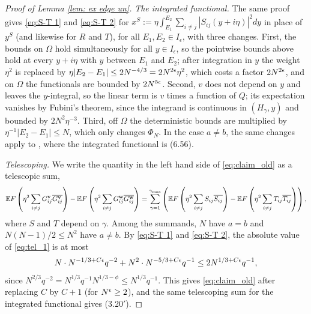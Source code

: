 \begin{proof}[Proof of Lemma \ref{lem: ex edge un}]
\textit{The integrated functional.} The same proof gives \eqref{eq:S-T 1} and \eqref{eq:S-T 2} for $x^S:=\eta\int_{E_1}^{E_2}\sum_{i\ne j}|S_{ij}(y+i\eta)|^2dy$ in place of $y^S$ (and likewise for $R$ and $T$), for all $E_1,E_2\in I_\epsilon$, with three changes. First, the bounds on $\Omega$ hold simultaneously for all $y\in I_\epsilon$, so the pointwise bounds above hold at every $y+i\eta$ with $y$ between $E_1$ and $E_2$; after integration in $y$ the weight $\eta^2$ is replaced by $\eta|E_2-E_1|\le 2N^{-4/3}=2N^{2\epsilon}\eta^2$, which costs a factor $2N^{2\epsilon}$, and on $\Omega$ the functionals are bounded by $2N^{5\epsilon}$. Second, $v$ does not depend on $y$ and leaves the $y$-integral, so the linear term is $v$ times a function of $Q$; its expectation vanishes by Fubini's theorem, since the integrand is continuous in $(H_\gamma,y)$ and bounded by $2N^2\eta^{-3}$. Third, off $\Omega$ the deterministic bounds are multiplied by $\eta^{-1}|E_2-E_1|\le N$, which only changes $\Phi_N$. In the case $a\ne b$, the same changes apply to \cite[(6.41)--(6.97)]{EKYY2}, where the integrated functional is (6.56).

\textit{Telescoping.} We write the quantity in the left hand side of \eqref{eq:claim_old} as a telescopic sum,
\begin{equation} \label{eq:tel_1}
\mathbb{E} F \left( \eta^2 \sum_{i \neq j} G^{\mathbf{v}}_{ij} \overline{G^{\mathbf{v}}_{ij}} \right) - \mathbb{E} F \left( \eta^2 \sum_{i \neq j} G^{\mathbf{w}}_{ij} \overline{G^{\mathbf{w}}_{ij}} \right) = \sum_{\gamma=1}^{\gamma_{\max}} \left(\mathbb{E} F \left( \eta^2 \sum_{i \neq j} S_{ij} \overline{S_{ij}} \right) - \mathbb{E} F \left( \eta^2 \sum_{i \neq j} T_{ij} \overline{T_{ij}} \right)\right),
\end{equation}
where $S$ and $T$ depend on $\gamma$. Among the summands, $N$ have $a=b$ and $N(N-1)/2\le N^2$ have $a\ne b$. By \eqref{eq:S-T 1} and \eqref{eq:S-T 2}, the absolute value of \eqref{eq:tel_1} is at most
$$
N\cdot N^{-1/3+C\epsilon}q^{-2}+N^2\cdot N^{-5/3+C\epsilon}q^{-1}\le 2N^{1/3+C\epsilon}q^{-1},
$$
since $N^{2/3}q^{-2}=N^{1/3}q^{-1}N^{1/3-\phi}\le N^{1/3}q^{-1}$. This gives \eqref{eq:claim_old} after replacing $C$ by $C+1$ (for $N^{\epsilon}\ge2$), and the same telescoping sum for the integrated functional gives (3.20$'$).


\end{proof}
